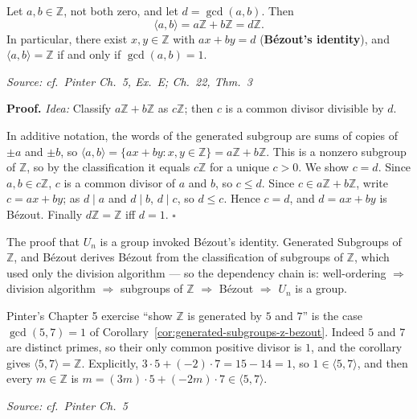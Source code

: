\documentclass[11pt]{report}
\renewenvironment{proof}[1][Proof]{\noindent\textbf{#1.} }{\hfill$\square$\par\vspace{5pt}}
\newcommand{\srcline}[1]{\par\hfill{\footnotesize\textit{Source: #1}}}
\begin{document}
\begin{corbox}\label{cor:generated-subgroups-z-bezout}
Let $a, b \in \mathbb{Z}$, not both zero, and let $d = \gcd(a, b)$. Then
\[ \langle a, b \rangle = a\mathbb{Z} + b\mathbb{Z} = d\mathbb{Z}. \]
In particular, there exist $x, y \in \mathbb{Z}$ with $ax + by = d$ (\textbf{B\'ezout's identity}), and $\langle a, b \rangle = \mathbb{Z}$ if and only if $\gcd(a, b) = 1$.
\srcline{cf.\ Pinter Ch.\ 5, Ex.\ E; Ch.\ 22, Thm.\ 3}
\end{corbox}

\begin{proof}
\textit{Idea:} Classify $a\mathbb{Z} + b\mathbb{Z}$ as $c\mathbb{Z}$; then $c$ is a common divisor divisible by $d$.\par
In additive notation, the words of the generated subgroup are sums of copies of $\pm a$ and $\pm b$, so $\langle a, b \rangle = \{ax + by : x, y \in \mathbb{Z}\} = a\mathbb{Z} + b\mathbb{Z}$. This is a nonzero subgroup of $\mathbb{Z}$, so by the classification it equals $c\mathbb{Z}$ for a unique $c > 0$. We show $c = d$. Since $a, b \in c\mathbb{Z}$, $c$ is a common divisor of $a$ and $b$, so $c \leq d$. Since $c \in a\mathbb{Z} + b\mathbb{Z}$, write $c = ax + by$; as $d \mid a$ and $d \mid b$, $d \mid c$, so $d \leq c$. Hence $c = d$, and $d = ax + by$ is B\'ezout. Finally $d\mathbb{Z} = \mathbb{Z}$ iff $d = 1$.
\end{proof}

\begin{rembox}\label{rem:dependency-un-bezout}
The proof that $U_n$ is a group invoked B\'ezout's identity. Generated Subgroups of $\mathbb{Z}$, and B\'ezout derives B\'ezout from the classification of subgroups of $\mathbb{Z}$, which used only the division algorithm --- so the dependency chain is: well-ordering $\Rightarrow$ division algorithm $\Rightarrow$ subgroups of $\mathbb{Z}$ $\Rightarrow$ B\'ezout $\Rightarrow$ $U_n$ is a group.
\end{rembox}

\begin{exbox}\label{ex:z-generated-by-5-and-7}
Pinter's Chapter 5 exercise ``show $\mathbb{Z}$ is generated by $5$ and $7$'' is the case $\gcd(5, 7) = 1$ of Corollary~\ref{cor:generated-subgroups-z-bezout}. Indeed $5$ and $7$ are distinct primes, so their only common positive divisor is $1$, and the corollary gives $\langle 5, 7 \rangle = \mathbb{Z}$. Explicitly, $3 \cdot 5 + (-2) \cdot 7 = 15 - 14 = 1$, so $1 \in \langle 5, 7 \rangle$, and then every $m \in \mathbb{Z}$ is $m = (3m) \cdot 5 + (-2m) \cdot 7 \in \langle 5, 7 \rangle$.
\srcline{cf.\ Pinter Ch.\ 5}
\end{exbox}
\end{document}
